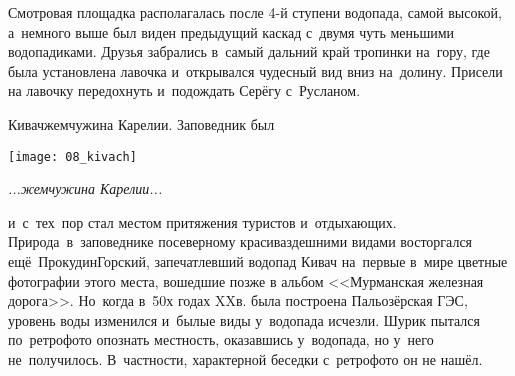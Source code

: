 
\noindent
\begin{minipage}{0.45\textwidth}
	\setlength{\parindent}{1.0cm}  %
	
	\indent Смотровая площадка располагалась после 4-й ступени водопада, самой высокой, а~немного выше был виден предыдущий каскад с~двумя чуть меньшими водопадиками. Друзья забрались в~самый дальний край тропинки на~гору, где была установлена лавочка и~открывался чудесный вид вниз на~долину. Присели на лавочку передохнуть и~подождать Серёгу с~Русланом.
	
	\indent Кивач\mdash жемчужина Карелии. Заповедник был 
\end{minipage}\hfill
\begin{minipage}{0.5\textwidth}
	\centering
	\texttt{[image: 08\_kivach]}
	
	{\small\textit{...жемчужина Карелии...}}
\end{minipage}

\newpage
\noindent и~с~тех~пор стал местом притяжения туристов и~отдыхающих. Природа~в~заповеднике по\sdash северному красива\mdash здешними видами восторгался ещё~Прокудин\sdash Горский, запечатлевший водопад Кивач на~первые в~мире цветные фотографии этого места, вошедшие позже в альбом <<Мурманская железная дорога>>. Но~когда в~50\sdash х годах XX\hspace{0.25em}в. была построена Пальозёрская ГЭС, уровень воды изменился и~былые виды у~водопада исчезли. Шурик пытался по~ретро\sdash фото\cite{ПрокудинГорский} опознать местность, оказавшись у~водопада, но у~него не~получилось. В~частности, характерной беседки с~ретро\sdash фото он не нашёл.

